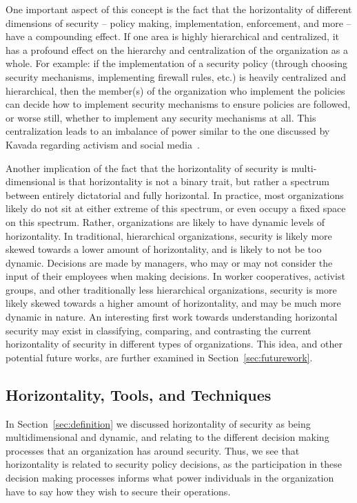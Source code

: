 One important aspect of this concept is the fact that the horizontality of 
different dimensions of security -- policy making, implementation, enforcement,
and more -- have a compounding effect. If one area is highly hierarchical and
centralized, it has a profound effect on the hierarchy and centralization of the
organization as a whole. For example: if the implementation of a security policy
(through choosing security mechanisms, implementing firewall rules, etc.) is
heavily centralized and hierarchical, then the member(s) of the organization who
implement the policies can decide how to implement security mechanisms to ensure
policies are followed, or worse still, whether to implement any security
mechanisms at all. This centralization leads to an imbalance of power similar to
the one discussed by Kavada regarding activism and social
media~\cite{kavada2020counterpublics}.

Another implication of the fact that the horizontality of security is
multi-dimensional is that horizontality is not a binary trait, but rather a
spectrum between entirely dictatorial and fully horizontal. In practice, most
organizations likely do not sit at either extreme of this spectrum, or even
occupy a fixed space on this spectrum. Rather, organizations are likely to have
dynamic levels of horizontality. In traditional, hierarchical organizations,
security is likely more skewed towards a lower amount of horizontality, and is
likely to not be too dynamic. Decisions are made by managers, who may or may not
consider the input of their employees when making decisions. In worker
cooperatives,  activist groups, and other traditionally less hierarchical
organizations, security is more likely skewed towards a higher amount of
horizontality, and may be much more dynamic in nature. An interesting first work
towards understanding horizontal security may exist in classifying, comparing,
and contrasting the current horizontality of security in different types of
organizations. This idea, and other potential future works, are further examined
in Section~\ref{sec:futurework}.

\subsection{Horizontality, Tools, and Techniques}
In Section~\ref{sec:definition} we discussed horizontality of security as being
multidimensional and dynamic, and relating to the different decision making
processes that an organization has around security. Thus, we see that
horizontality is related to security policy decisions, as the participation in
these decision making processes informs what power individuals in the
organization have to say how they wish to secure their operations.

